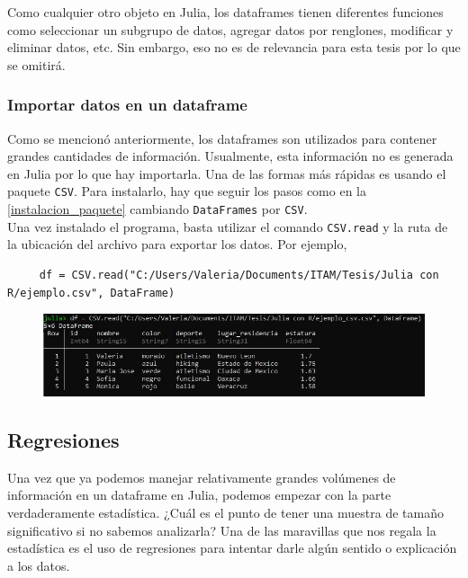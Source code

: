 Como cualquier otro objeto en Julia, los dataframes tienen diferentes funciones como seleccionar un subgrupo de datos, agregar datos por renglones, modificar y eliminar datos, etc. Sin embargo, eso no es de relevancia para esta tesis por lo que se omitirá. 

\subsubsection{Importar datos en un dataframe}

Como se mencionó anteriormente, los dataframes son utilizados para contener grandes cantidades de información. Usualmente, esta información no es generada en Julia por lo que hay importarla. Una de las formas más rápidas es usando el paquete \texttt{CSV}. Para instalarlo, hay que seguir los pasos como en la  \ref{instalacion_paquete} cambiando \texttt{DataFrames} por \texttt{CSV}. 
\\
Una vez instalado el programa, basta utilizar el comando \texttt{CSV.read} y la ruta de la ubicación del archivo para exportar los datos. Por ejemplo, 

\begin{verbatim}
     df = CSV.read("C:/Users/Valeria/Documents/ITAM/Tesis/Julia con R/ejemplo.csv", DataFrame)
\end{verbatim}

\begin{figure}[h]
\begin{center}
\includegraphics[scale=0.6]{Imagenes/insertar_df.JPG}
  \label{insertar_df}
\end{center}
\end{figure}

\subsection{Regresiones}

Una vez que ya podemos manejar relativamente grandes volúmenes de información en un dataframe en Julia, podemos empezar con la parte verdaderamente estadística. ¿Cuál es el punto de tener una muestra de tamaño significativo si no sabemos analizarla? Una de las maravillas que nos regala la estadística es el uso de regresiones para intentar darle algún sentido o explicación a los datos. 


